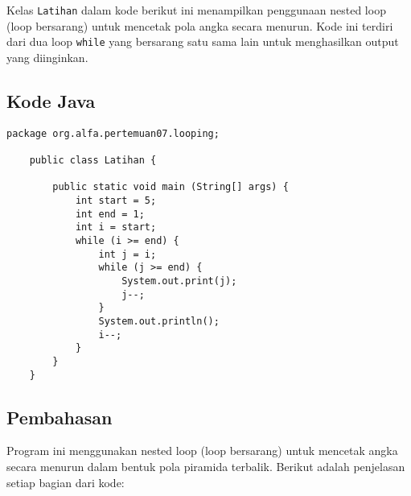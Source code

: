 Kelas \texttt{Latihan} dalam kode berikut ini menampilkan penggunaan nested loop (loop bersarang) untuk mencetak pola angka secara menurun. Kode ini terdiri dari dua loop \texttt{while} yang bersarang satu sama lain untuk menghasilkan output yang diinginkan.

\subsection{Kode Java}
\begin{lstlisting}[style=JavaStyle]
	package org.alfa.pertemuan07.looping;
	
	public class Latihan {
		
		public static void main (String[] args) {
			int start = 5;
			int end = 1;
			int i = start;
			while (i >= end) {
				int j = i;
				while (j >= end) {
					System.out.print(j);
					j--;
				}
				System.out.println();
				i--;
			}
		}
	}
\end{lstlisting}

\subsection{Pembahasan}
Program ini menggunakan nested loop (loop bersarang) untuk mencetak angka secara menurun dalam bentuk pola piramida terbalik. Berikut adalah penjelasan setiap bagian dari kode:

